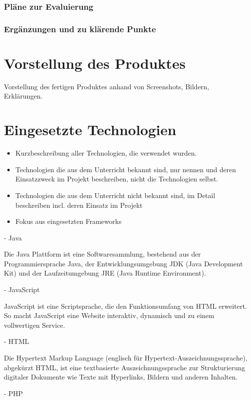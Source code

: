 \subsection{Pläne zur Evaluierung}
\subsection{Ergänzungen und zu klärende Punkte}

\chapter{Vorstellung des Produktes}
Vorstellung des fertigen Produktes anhand von Screenshots, Bildern, Erklärungen.


\chapter{Eingesetzte Technologien}


\begin{itemize}
	\item Kurzbeschreibung aller Technologien, die verwendet wurden.
	\item Technologien die aus dem Unterricht bekannt sind, nur nennen und deren  Einsatzzweck im Projekt beschreiben, nicht die Technologien selbst.
	\item Technologien die aus dem Unterricht nicht bekannt sind, im Detail beschreiben incl. deren Einsatz im Projekt
	\item Fokus aus eingesetzten Frameworks
\end{itemize}


- Java

Die Java Plattform ist eine Softwaresammlung, bestehend aus der Programmiersprache Java, der Entwicklungsumgebung JDK (Java Development Kit) und der Laufzeitumgebung JRE (Java Runtime Environment).
		
- JavaScript
		
JavaScript ist eine Scriptsprache, die den Funktionsumfang von HTML erweitert. So macht JavaScript eine Website interaktiv, dynamisch und zu einem vollwertigen Service.
			
- HTML

Die Hypertext Markup Language (englisch für Hypertext-Auszeichnungssprache), abgekürzt HTML, ist eine textbasierte Auszeichnungssprache zur Strukturierung digitaler Dokumente wie Texte mit Hyperlinks, Bildern und anderen Inhalten.
	
- PHP

